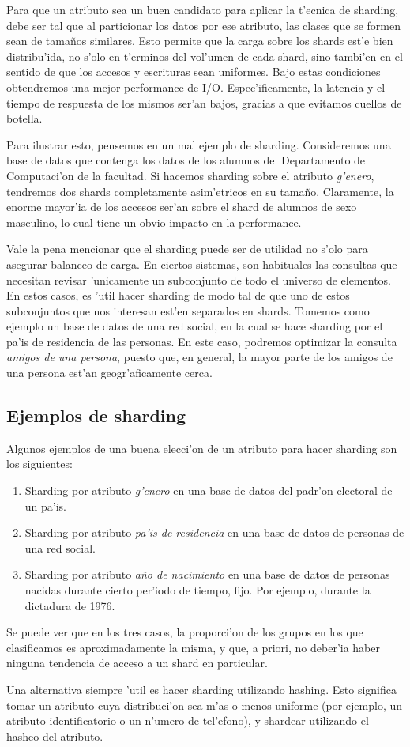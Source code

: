 Para que un atributo sea un buen candidato para aplicar la t'ecnica de sharding, debe ser tal que al particionar los datos por ese atributo, las clases que se formen sean de tama\~nos similares. Esto permite que la carga sobre los shards est'e bien distribu'ida, no s'olo en t'erminos del vol'umen de cada shard, sino tambi'en en el sentido de que los accesos y escrituras sean uniformes. Bajo estas condiciones obtendremos una mejor performance de I/O. Espec'ificamente, la latencia y el tiempo de respuesta de los mismos ser'an bajos, gracias a que evitamos cuellos de botella.

Para ilustrar esto, pensemos en un mal ejemplo de sharding. Consideremos una base de datos que contenga los datos de los alumnos del Departamento de Computaci'on de la facultad. Si hacemos sharding sobre el atributo \emph{g'enero}, tendremos dos shards completamente asim'etricos en su tama\~no. Claramente, la enorme mayor'ia de los accesos ser'an sobre el shard de alumnos de sexo masculino, lo cual tiene un obvio impacto en la performance.

Vale la pena mencionar que el sharding puede ser de utilidad no s'olo para asegurar balanceo de carga. En ciertos sistemas, son habituales las consultas que necesitan revisar 'unicamente un subconjunto de todo el universo de elementos. En estos casos, es 'util hacer sharding de modo tal de que uno de estos subconjuntos que nos interesan est'en separados en shards. Tomemos como ejemplo un base de datos de una red social, en la cual se hace sharding por el pa'is de residencia de las personas. En este caso, podremos optimizar la consulta \textit{amigos de una persona}, puesto que, en general, la mayor parte de los amigos de una persona est'an geogr'aficamente cerca.

\subsection{Ejemplos de sharding}

Algunos ejemplos de una buena elecci'on de un atributo para hacer sharding son los siguientes:

\begin{enumerate}
	\item Sharding por atributo \emph{g'enero} en una base de datos del padr'on electoral de un pa'is.
	\item Sharding por atributo \emph{pa'is de residencia} en una base de datos de personas de una red social.
	\item Sharding por atributo \emph{a\~no de nacimiento} en una base de datos de personas nacidas durante cierto per'iodo de tiempo, fijo. Por ejemplo, durante la dictadura de 1976.
\end{enumerate}

Se puede ver que en los tres casos, la proporci'on de los grupos en los que clasificamos es aproximadamente la misma, y que, a priori, no deber'ia haber ninguna tendencia de acceso a un shard en particular.

Una alternativa siempre 'util es hacer sharding utilizando hashing. Esto significa tomar un atributo cuya distribuci'on sea m'as o menos uniforme (por ejemplo, un atributo identificatorio o un n'umero de tel'efono), y shardear utilizando el hasheo del atributo. 